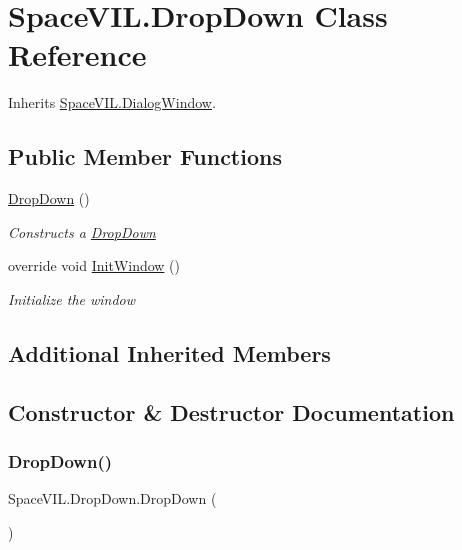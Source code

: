 \hypertarget{class_space_v_i_l_1_1_drop_down}{}\section{Space\+V\+I\+L.\+Drop\+Down Class Reference}
\label{class_space_v_i_l_1_1_drop_down}


Inherits \mbox{\hyperlink{class_space_v_i_l_1_1_dialog_window}{Space\+V\+I\+L.\+Dialog\+Window}}.

\subsection*{Public Member Functions}
\begin{DoxyCompactItemize}
\item 
\mbox{\hyperlink{class_space_v_i_l_1_1_drop_down_ab5b7094ae2321a4b980e3503a1cf494a}{Drop\+Down}} ()
\begin{DoxyCompactList}\small\item\em Constructs a \mbox{\hyperlink{class_space_v_i_l_1_1_drop_down}{Drop\+Down}} \end{DoxyCompactList}\item 
override void \mbox{\hyperlink{class_space_v_i_l_1_1_drop_down_a291f706e5ec6558798d20fa428b2ba91}{Init\+Window}} ()
\begin{DoxyCompactList}\small\item\em Initialize the window \end{DoxyCompactList}\end{DoxyCompactItemize}
\subsection*{Additional Inherited Members}


\subsection{Constructor \& Destructor Documentation}
\mbox{\label{class_space_v_i_l_1_1_drop_down_ab5b7094ae2321a4b980e3503a1cf494a}} 
\subsubsection{\texorpdfstring{Drop\+Down()}{DropDown()}}
{\footnotesize\ttfamily Space\+V\+I\+L.\+Drop\+Down.\+Drop\+Down (\begin{DoxyParamCaption}{ }\end{DoxyParamCaption})}



